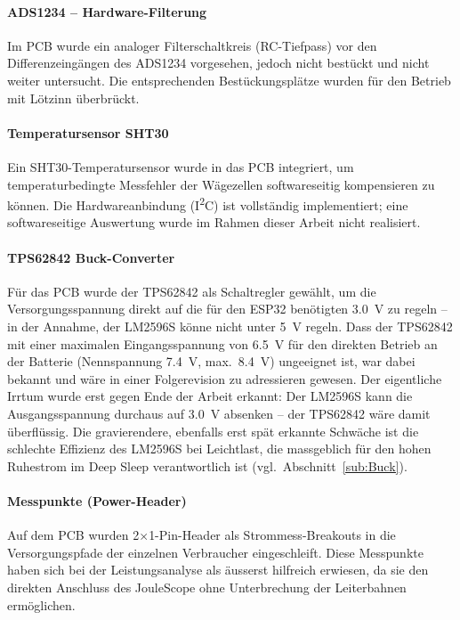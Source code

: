 \documentclass[12pt,a4paper]{article}
\begin{document}
\paragraph{ADS1234 -- Hardware-Filterung}
Im PCB wurde ein analoger Filterschaltkreis (RC-Tiefpass) vor den Differenzeingängen des ADS1234
vorgesehen, jedoch nicht bestückt und nicht weiter untersucht.
Die entsprechenden Bestückungsplätze wurden für den Betrieb mit Lötzinn überbrückt.

\paragraph{Temperatursensor SHT30}
Ein SHT30-Temperatursensor wurde in das PCB integriert, um temperaturbedingte Messfehler der
Wägezellen softwareseitig kompensieren zu können.
Die Hardwareanbindung (I\textsuperscript{2}C) ist vollständig implementiert; eine softwareseitige
Auswertung wurde im Rahmen dieser Arbeit nicht realisiert.

\paragraph{TPS62842 Buck-Converter}
Für das PCB wurde der TPS62842 als Schaltregler gewählt, um die Versorgungsspannung direkt auf die für den ESP32 benötigten \SI{3.0}{\volt} zu regeln -- in der Annahme, der LM2596S könne nicht unter \SI{5}{\volt} regeln.
Dass der TPS62842 mit einer maximalen Eingangsspannung von \SI{6.5}{\volt} für den direkten Betrieb an der Batterie (Nennspannung \SI{7.4}{\volt}, max.\ \SI{8.4}{\volt}) ungeeignet ist, war dabei bekannt und wäre in einer Folgerevision zu adressieren gewesen.
Der eigentliche Irrtum wurde erst gegen Ende der Arbeit erkannt: Der LM2596S kann die Ausgangsspannung durchaus auf \SI{3.0}{\volt} absenken -- der TPS62842 wäre damit überflüssig.
Die gravierendere, ebenfalls erst spät erkannte Schwäche ist die schlechte Effizienz des LM2596S bei Leichtlast, die massgeblich für den hohen Ruhestrom im Deep Sleep verantwortlich ist (vgl.\ Abschnitt~\ref{sub:Buck}).

\paragraph{Messpunkte (Power-Header)}
Auf dem PCB wurden 2$\times$1-Pin-Header als Strommess-Breakouts in die Versorgungspfade der
einzelnen Verbraucher eingeschleift.
Diese Messpunkte haben sich bei der Leistungsanalyse als äusserst
hilfreich erwiesen, da sie den direkten Anschluss des JouleScope ohne Unterbrechung der
Leiterbahnen ermöglichen.
\end{document}
